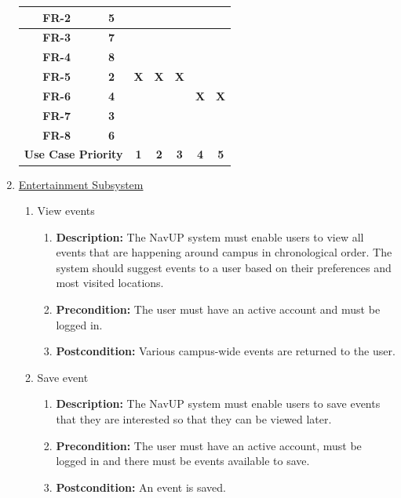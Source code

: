 \documentclass{article}
\begin{document}
\begin{enumerate}
\begin{table}[H]
\begin{tabular}{|c|c|c|c|c|c|c|}
\textbf{FR-2}            & \textbf{5}            & \textbf{}    & \textbf{}    & \textbf{}    & \textbf{}    & \textbf{}    \\ \hline
\textbf{FR-3}            & \textbf{7}            & \textbf{}    & \textbf{}    & \textbf{}    & \textbf{}    & \textbf{}    \\ \hline
\textbf{FR-4}            & \textbf{8}            & \textbf{}    & \textbf{}    & \textbf{}    & \textbf{}    & \textbf{}    \\ \hline
\textbf{FR-5}            & \textbf{2}            & \textbf{X}   & \textbf{X}   & \textbf{X}   & \textbf{}    & \textbf{}    \\ \hline
\textbf{FR-6}            & \textbf{4}            & \textbf{}    & \textbf{}    & \textbf{}    & \textbf{X}   & \textbf{X}   \\ \hline
\textbf{FR-7}            & \textbf{3}            & \textbf{}    & \textbf{}    & \textbf{}    & \textbf{}    & \textbf{}    \\ \hline
\textbf{FR-8}            & \textbf{6}            & \textbf{}    & \textbf{}    & \textbf{}    & \textbf{}    & \textbf{}    \\ \hline
\multicolumn{2}{|c|}{\textbf{Use Case Priority}} & \textbf{1}   & \textbf{2}   & \textbf{3}   & \textbf{4}   & \textbf{5}   \\ \hline
\end{tabular}
\end{table}	
	
	\item \underline{Entertainment Subsystem}
			\begin{enumerate}
		\item View events
		\begin{enumerate}
			\item \textbf{Description:} The NavUP system must enable users to view all events that are happening around campus in chronological order. The system should suggest events to a user based on their preferences and most visited locations.
			\item \textbf{Precondition:} The user must have an active account and must be logged in.
			\item \textbf{Postcondition:} Various campus-wide events are returned to the user.\newline
		\end{enumerate}
		
		\item Save event
		\begin{enumerate}
			\item \textbf{Description:} The NavUP system must enable users to save events that they are interested so that they can be viewed later.
			\item \textbf{Precondition:} The user must have an active account, must be logged in and there must be events available to save.
			\item \textbf{Postcondition:} An event is saved.\newline
		\end{enumerate}
		

\end{enumerate}
\end{enumerate}
\end{document}

